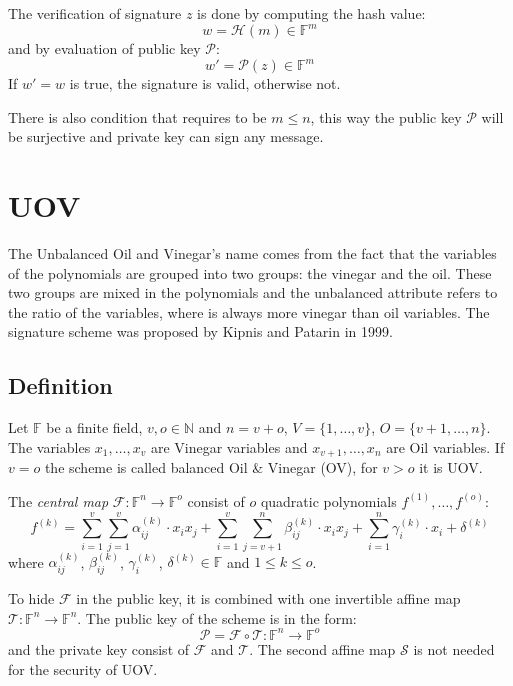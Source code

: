 \documentclass[thesis=M,english]{FITthesis}[2019/12/23]
\begin{document}
The verification of signature $z$ is done by computing the hash value:
\[
	w = \mathcal{H}(m) \in \mathbb{F}^m
\]
and by evaluation of public key $\mathcal{P}$:
\[
	w' = \mathcal{P}(z) \in \mathbb{F}^m
\]
If $w' = w$ is true, the signature is valid, otherwise not.

There is also condition that requires to be $m \leq n$, this way the public key $\mathcal{P}$ will be surjective and private key can sign any message.

\section{UOV}
The Unbalanced Oil and Vinegar's name comes from the fact that the variables of the polynomials are grouped into two groups: the vinegar and the oil. These two groups are mixed in the polynomials and the unbalanced attribute refers to the ratio of the variables, where is always more vinegar than oil variables. The signature scheme was proposed by Kipnis and Patarin in 1999.

\subsection{Definition}
Let $\mathbb{F}$ be a finite field, $v,o \in \mathbb{N}$ and $n=v+o$, $V=\{1, \ldots, v\}$, $O=\{v+1, \ldots, n\}$. The variables $x_1, \ldots, x_v$ are Vinegar variables and $x_{v+1}, \ldots, x_n$ are Oil variables. If $v=o$ the scheme is called balanced Oil \& Vinegar (OV), for $v>o$ it is UOV.

\bigskip
\noindent
The \textit{central map} $\mathcal{F}:\mathbb{F}^n \rightarrow \mathbb{F}^o$ consist of $o$ quadratic polynomials $f^{(1)}, \ldots, f^{(o)}$:
\[
	f^{(k)} = \sum\limits_{i=1}^{v} {\sum\limits_{j=1}^{v} {\alpha_{ij}^{(k)} \cdot x_ix_j}} +  \sum\limits_{i=1}^{v} {\sum\limits_{j=v+1}^{n} {\beta_{ij}^{(k)} \cdot x_ix_j}}+ \sum\limits_{i=1}^{n} {\gamma_{i}^{(k)} \cdot x_i} + \delta^{(k)}
\]
where $\alpha_{ij}^{(k)}$, $\beta_{ij}^{(k)}$, $\gamma_{i}^{(k)}$, $\delta^{(k)} \in \mathbb{F}$ and $1 \leq k \leq o$.

\bigskip
\noindent
To hide $\mathcal{F}$ in the public key, it is combined with one invertible affine map $\mathcal{T}: \mathbb{F}^n \rightarrow \mathbb{F}^n$. The public key of the scheme is in the form:
\[
	\mathcal{P} = \mathcal{F} \circ \mathcal{T} : \mathbb{F}^n \rightarrow \mathbb{F}^o
\]
and the private key consist of $\mathcal{F}$ and $\mathcal{T}$. The second affine map $\mathcal{S}$ is not needed for the security of UOV.
\end{document}
